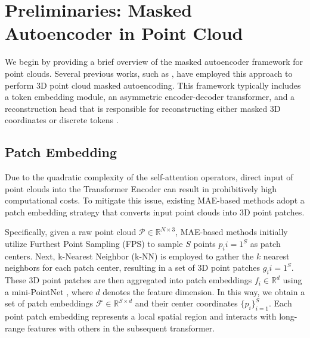 \documentclass[sigconf, screen]{acmart}
\begin{document}
\section{Preliminaries: Masked Autoencoder in Point Cloud}
We begin by providing a brief overview of the masked autoencoder framework for point clouds. Several previous works, such as \cite{yu2022point, dong2022autoencoders, pang2022masked, zhang2022point}, have employed this approach to perform 3D point cloud masked autoencoding. This framework typically includes a token embedding module, an asymmetric encoder-decoder transformer, and a reconstruction head that is responsible for reconstructing either masked 3D coordinates \cite{pang2022masked, zhang2022point} or discrete tokens \cite{yu2022point, dong2022autoencoders}.
\subsection{Patch Embedding} 
Due to the quadratic complexity of the self-attention operators, direct input of point clouds into the Transformer Encoder can result in prohibitively high computational costs. To mitigate this issue, existing MAE-based methods \cite{pang2022masked, yu2022point} adopt a patch embedding strategy that converts input point clouds into 3D point patches. 

Specifically, given a raw point cloud $\mathcal{P}\in\mathbb R^{N\times3}$, MAE-based methods initially utilize Furthest Point Sampling (FPS) to sample $S$ points ${p_i}{i=1}^S$ as patch centers. Next, k-Nearest Neighbor (k-NN) is employed to gather the $k$ nearest neighbors for each patch center, resulting in a set of 3D point patches ${g_i}{i=1}^S$. These 3D point patches are then aggregated into patch embeddings $f_i \in\mathbb R^d$ using a mini-PointNet \cite{qi2017pointnet}, where $d$ denotes the feature dimension. In this way, we obtain a set of patch embeddings $\mathcal{F} \in\mathbb R^{S\times d}$ and their center coordinates $\{p_i\}_{i=1}^S$.
Each point patch embedding represents a local spatial region and interacts with long-range features with others in the subsequent transformer. 
\end{document}
